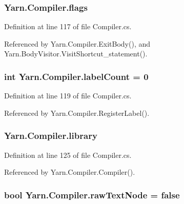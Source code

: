 \hypertarget{a00051_a541022d89bcf9bc8f794eb6d6b438d08}{
\subsubsection[{flags}]{ Yarn.\-Compiler.\-flags\hspace{0.3cm}{\ttfamily [package]}}}\label{a00051_a541022d89bcf9bc8f794eb6d6b438d08}


Definition at line 117 of file Compiler.\-cs.



Referenced by Yarn.\-Compiler.\-Exit\-Body(), and Yarn.\-Body\-Visitor.\-Visit\-Shortcut\-\_\-statement().

\hypertarget{a00051_a87758397eba2e84cda8e0d6c40656f3f}{
\subsubsection[{label\-Count}]{\setlength{\rightskip}{0pt plus 5cm}int Yarn.\-Compiler.\-label\-Count = 0\hspace{0.3cm}{\ttfamily [private]}}}\label{a00051_a87758397eba2e84cda8e0d6c40656f3f}


Definition at line 119 of file Compiler.\-cs.



Referenced by Yarn.\-Compiler.\-Register\-Label().

\hypertarget{a00051_ae211a0c080d18575bc3d299c207ef8ee}{
\subsubsection[{library}]{ Yarn.\-Compiler.\-library\hspace{0.3cm}{\ttfamily [package]}}}\label{a00051_ae211a0c080d18575bc3d299c207ef8ee}


Definition at line 125 of file Compiler.\-cs.



Referenced by Yarn.\-Compiler.\-Compiler().

\hypertarget{a00051_af6afc8ccb59931650919b863d62d52a4}{
\subsubsection[{raw\-Text\-Node}]{\setlength{\rightskip}{0pt plus 5cm}bool Yarn.\-Compiler.\-raw\-Text\-Node = false\hspace{0.3cm}{\ttfamily [package]}}}\label{a00051_af6afc8ccb59931650919b863d62d52a4}


